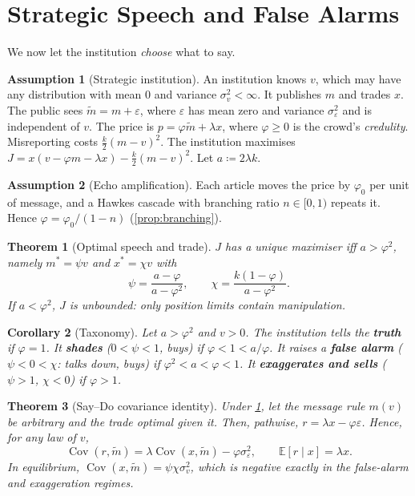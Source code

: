 \documentclass[10pt,twocolumn,letterpaper]{article}
\theoremstyle{plain}
\newtheorem{theorem}{Theorem}
\newtheorem{corollary}[theorem]{Corollary}
\theoremstyle{definition}
\newtheorem{assumption}{Assumption}
\theoremstyle{remark}
\newcommand{\E}{\mathbb{E}}
\DeclareMathOperator{\Cov}{Cov}
\begin{document}
\section{Strategic Speech and False Alarms}\label{sec:strategic}

We now let the institution \emph{choose} what to say.

\begin{assumption}[Strategic institution]\label{ass:strategic}
An institution knows $v$, which may have any distribution with mean $0$ and variance $\sigma_v^2<\infty$. It publishes $m$ and trades $x$. The public sees $\tilde m=m+\varepsilon$, where $\varepsilon$ has mean zero and variance $\sigma_\varepsilon^2$ and is independent of $v$. The price is $p=\varphi\tilde m+\lambda x$, where $\varphi\ge0$ is the crowd's \emph{credulity}. Misreporting costs $\tfrac k2(m-v)^2$. The institution maximises $J=x(v-\varphi m-\lambda x)-\tfrac k2(m-v)^2$. Let $a\coloneqq2\lambda k$.
\end{assumption}

\begin{assumption}[Echo amplification]\label{ass:amplify}
Each article moves the price by $\varphi_0$ per unit of message, and a Hawkes cascade with branching ratio $n\in[0,1)$ repeats it. Hence $\varphi=\varphi_0/(1-n)$ (\cref{prop:branching}).
\end{assumption}

\begin{theorem}[Optimal speech and trade]\label{thm:speech}
$J$ has a unique maximiser iff $a>\varphi^2$, namely $m^\ast=\psi v$ and $x^\ast=\chi v$ with
\[
  \psi=\frac{a-\varphi}{a-\varphi^2},\qquad \chi=\frac{k(1-\varphi)}{a-\varphi^2}.
\]
If $a<\varphi^2$, $J$ is unbounded: only position limits contain manipulation.
\end{theorem}

\begin{corollary}[Taxonomy]\label{cor:taxonomy}
Let $a>\varphi^2$ and $v>0$. The institution tells the \textbf{truth} if $\varphi=1$. It \textbf{shades} ($0<\psi<1$, buys) if $\varphi<1<a/\varphi$. It raises a \textbf{false alarm} ($\psi<0<\chi$: talks down, buys) if $\varphi^2<a<\varphi<1$. It \textbf{exaggerates and sells} ($\psi>1$, $\chi<0$) if $\varphi>1$.
\end{corollary}

\begin{theorem}[Say--Do covariance identity]\label{thm:identity}
Under \cref{ass:strategic}, let the message rule $m(v)$ be \emph{arbitrary} and the trade optimal given it. Then, pathwise, $r=\lambda x-\varphi\varepsilon$. Hence, for any law of $v$,
\[
  \Cov(r,\tilde m)=\lambda\Cov(x,\tilde m)-\varphi\sigma_\varepsilon^2,\qquad \E[r\mid x]=\lambda x.
\]
In equilibrium, $\Cov(x,\tilde m)=\psi\chi\sigma_v^2$, which is negative exactly in the false-alarm and exaggeration regimes.
\end{theorem}
\end{document}
